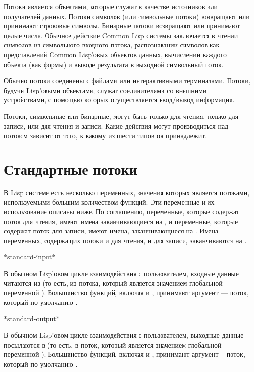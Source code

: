 Потоки является объектами, которые служат в качестве источников или получателей
данных.
Потоки символов (или символьные потоки) возвращают или принимают строковые
символы.
Бинарные потоки возвращают или принимают целые числа.
Обычное действие Common Lisp системы заключается в чтении символов из
символьного входного потока, распознавании символов как представлений Common
Lisp'овых объектов данных, вычислении каждого объекта (как формы) и выводе
результата в выходной символьный поток.

Обычно потоки соединены с файлами или интерактивными терминалами. 
Потоки, будучи Lisp'овыми объектами, служат соединителями со внешними
устройствами, с помощью которых осуществляется ввод/вывод информации.

Потоки, символьные или бинарные, могут быть только для чтения, только для
записи, или для чтения и записи.
Какие действия могут производиться над потоком зависит от того, к какому из шести
типов он принадлежит.

\section{Стандартные потоки}

В Lisp системе есть несколько переменных, значения которых является потоками,
используемыми большим количеством функций. Эти переменные и их использование
описаны ниже. По соглашению, переменные, которые содержат поток для чтения,
имеют имена заканчивающиеся на , и переменные, которые содержат поток
для записи, имеют имена, заканчивающиеся на .
Имена переменных, содержащих потоки и для чтения, и для записи, заканчиваются на
.

\begin{defun}[Переменная]
*standard-input*

В обычном Lisp'овом цикле взаимодействия с пользователем, входные данные
читаются из  (то есть, из потока, который является
значением глобальной переменной ). Большинство функций,
включая  и , принимают аргумент --- поток, который
по-умолчанию . 
\end{defun}

\begin{defun}[Переменная]
*standard-output*

В обычном Lisp'овом цикле взаимодействия с пользователем, выходные данные
посылаются в  (то есть, в поток, который является
значением глобальной переменной ). Большинство функций,
включая  и , принимают аргумент -- поток, который
по-умолчанию .
\end{defun}

